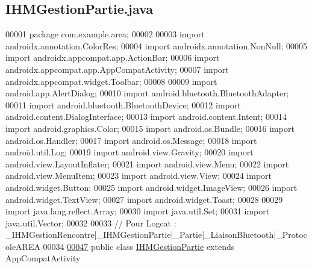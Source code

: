 \hypertarget{_i_h_m_gestion_partie_8java_source}{}\subsection{I\+H\+M\+Gestion\+Partie.\+java}
\label{_i_h_m_gestion_partie_8java_source}

\begin{DoxyCode}
00001 \textcolor{keyword}{package }com.example.area;
00002 
00003 \textcolor{keyword}{import} androidx.annotation.ColorRes;
00004 \textcolor{keyword}{import} androidx.annotation.NonNull;
00005 \textcolor{keyword}{import} androidx.appcompat.app.ActionBar;
00006 \textcolor{keyword}{import} androidx.appcompat.app.AppCompatActivity;
00007 \textcolor{keyword}{import} androidx.appcompat.widget.Toolbar;
00008 
00009 \textcolor{keyword}{import} android.app.AlertDialog;
00010 \textcolor{keyword}{import} android.bluetooth.BluetoothAdapter;
00011 \textcolor{keyword}{import} android.bluetooth.BluetoothDevice;
00012 \textcolor{keyword}{import} android.content.DialogInterface;
00013 \textcolor{keyword}{import} android.content.Intent;
00014 \textcolor{keyword}{import} android.graphics.Color;
00015 \textcolor{keyword}{import} android.os.Bundle;
00016 \textcolor{keyword}{import} android.os.Handler;
00017 \textcolor{keyword}{import} android.os.Message;
00018 \textcolor{keyword}{import} android.util.Log;
00019 \textcolor{keyword}{import} android.view.Gravity;
00020 \textcolor{keyword}{import} android.view.LayoutInflater;
00021 \textcolor{keyword}{import} android.view.Menu;
00022 \textcolor{keyword}{import} android.view.MenuItem;
00023 \textcolor{keyword}{import} android.view.View;
00024 \textcolor{keyword}{import} android.widget.Button;
00025 \textcolor{keyword}{import} android.widget.ImageView;
00026 \textcolor{keyword}{import} android.widget.TextView;
00027 \textcolor{keyword}{import} android.widget.Toast;
00028 
00029 \textcolor{keyword}{import} java.lang.reflect.Array;
00030 \textcolor{keyword}{import} java.util.Set;
00031 \textcolor{keyword}{import} java.util.Vector;
00032 
00033 \textcolor{comment}{// Pour Logcat : \_IHMGestionRencontre|\_IHMGestionPartie|\_Partie|\_LiaisonBluetooth|\_ProtocoleAREA}
00034 
\hyperlink{classcom_1_1example_1_1area_1_1_i_h_m_gestion_partie}{00047} \textcolor{keyword}{public} \textcolor{keyword}{class }\hyperlink{classcom_1_1example_1_1area_1_1_i_h_m_gestion_partie}{IHMGestionPartie} \textcolor{keyword}{extends} AppCompatActivity

\end{DoxyCode}
